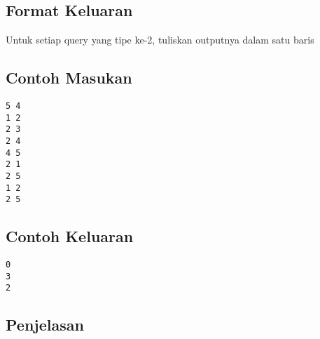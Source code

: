 \documentclass{article}
\begin{document}
\subsection*{Format Keluaran}
Untuk setiap query yang tipe ke-2, tuliskan outputnya dalam satu baris
\\

\begin{multicols}{2}
\subsection*{Contoh Masukan}
\begin{lstlisting}
5 4
1 2
2 3
2 4
4 5
2 1
2 5
1 2
2 5
\end{lstlisting}
\columnbreak
\subsection*{Contoh Keluaran}
\begin{lstlisting}
0
3
2
\end{lstlisting}
\vfill
\null
\end{multicols}

\subsection*{Penjelasan}
 

\pagebreak
\end{document}

